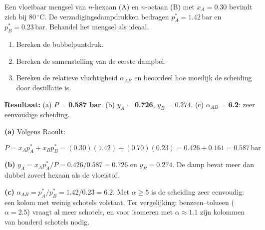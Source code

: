 \begin{oefening}\label{oef:h5-2}
Een vloeibaar mengsel van \(n\)-hexaan (A) en \(n\)-octaan (B) met \(x_A = 0.30\) bevindt zich bij \(80\,^\circ\mathrm{C}\). De verzadigingsdampdrukken bedragen \(p_A^* = 1.42\,\mathrm{bar}\) en \(p_B^* = 0.23\,\mathrm{bar}\). Behandel het mengsel als ideaal.

\begin{enumerate}
\item[(a)]
  Bereken de bubbelpuntdruk.
\item[(b)]
  Bereken de samenstelling van de eerste dampbel.
\item[(c)]
  Bereken de relatieve vluchtigheid \(\alpha_{AB}\) en beoordeel hoe moeilijk de scheiding door destillatie is.
\end{enumerate}
\end{oefening}
\begin{oplossing}
\textbf{Resultaat:} (a) \(P\) = \textbf{0.587 bar}. (b) \(y_A\) = \textbf{0.726}, \(y_B\) = 0.274. (c) \(\alpha_{AB}\) = \textbf{6.2}: zeer eenvoudige scheiding.

\textbf{(a)} Volgens Raoult:

\[
P = x_A p_A^* + x_B p_B^* = (0.30)(1.42) + (0.70)(0.23) = 0.426 + 0.161 = 0.587\,\mathrm{bar}
\]

\textbf{(b)} \(y_A = x_A p_A^*/P = 0.426/0.587 = 0.726\) en \(y_B = 0.274\). De damp bevat meer dan dubbel zoveel hexaan als de vloeistof.

\textbf{(c)} \(\alpha_{AB} = p_A^*/p_B^* = 1.42/0.23 = 6.2\). Met \(\alpha \geq 5\) is de scheiding zeer eenvoudig: een kolom met weinig schotels volstaat. Ter vergelijking: benzeen--tolueen (\(\alpha = 2.5\)) vraagt al meer schotels, en voor isomeren met \(\alpha \approx 1.1\) zijn kolommen van honderd schotels nodig.
\end{oplossing}


